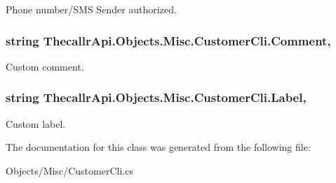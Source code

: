 Phone number/\+S\+M\+S Sender authorized. 

\hypertarget{class_thecallr_api_1_1_objects_1_1_misc_1_1_customer_cli_a7a499a1a059a4c49fca2ce8164a67d98}{
\subsubsection[{Comment}]{\setlength{\rightskip}{0pt plus 5cm}string Thecallr\+Api.\+Objects.\+Misc.\+Customer\+Cli.\+Comment\hspace{0.3cm}{\ttfamily [get]}, {\ttfamily [set]}}}\label{class_thecallr_api_1_1_objects_1_1_misc_1_1_customer_cli_a7a499a1a059a4c49fca2ce8164a67d98}


Custom comment. 

\hypertarget{class_thecallr_api_1_1_objects_1_1_misc_1_1_customer_cli_a1bda330a9e54b4ce6f863104fb7fced8}{
\subsubsection[{Label}]{\setlength{\rightskip}{0pt plus 5cm}string Thecallr\+Api.\+Objects.\+Misc.\+Customer\+Cli.\+Label\hspace{0.3cm}{\ttfamily [get]}, {\ttfamily [set]}}}\label{class_thecallr_api_1_1_objects_1_1_misc_1_1_customer_cli_a1bda330a9e54b4ce6f863104fb7fced8}


Custom label. 



The documentation for this class was generated from the following file\+:\begin{DoxyCompactItemize}
\item 
Objects/\+Misc/Customer\+Cli.\+cs\end{DoxyCompactItemize}

